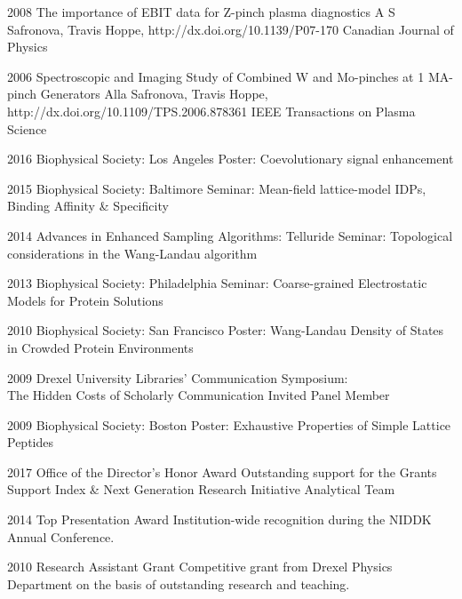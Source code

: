 \documentclass[]{scrartcl}
\begin{document}
\begin{cleanCV}
\Paper
{2008}
{The importance of EBIT data for Z-pinch plasma diagnostics}
{A S Safronova, Travis Hoppe, \etal}
{http://dx.doi.org/10.1139/P07-170}
{Canadian Journal of Physics}

\Paper
{2006}
{Spectroscopic and Imaging Study of Combined W and Mo-pinches 
  at 1 MA-pinch Generators}
{Alla Safronova, Travis Hoppe, \etal}
{http://dx.doi.org/10.1109/TPS.2006.878361}
{IEEE Transactions on Plasma Science}


\WorkExperienceX
{2016}
{Biophysical Society: Los Angeles}
{Poster: Coevolutionary signal enhancement}

\WorkExperienceX
{2015}
{Biophysical Society: Baltimore}
{Seminar: Mean-field lattice-model IDPs, Binding Affinity \& Specificity}

\WorkExperienceX
{2014}
{Advances in Enhanced Sampling Algorithms: Telluride}
{Seminar: Topological considerations in the Wang-Landau algorithm}

\WorkExperienceX
{2013}
{Biophysical Society: Philadelphia}
{Seminar: Coarse-grained Electrostatic Models for Protein Solutions}

\WorkExperienceX
{2010}
{Biophysical Society: San Francisco}
{Poster: Wang-Landau Density of States in Crowded Protein Environments}

\WorkExperienceX
{2009}
{Drexel University Libraries' Communication Symposium:\\The Hidden Costs of Scholarly Communication}
{Invited Panel Member}

\WorkExperienceX
{2009}
{Biophysical Society: Boston}
{Poster: Exhaustive Properties of Simple Lattice Peptides}



\WorkExperienceX
{2017}
{Office of the Director's Honor Award}
{Outstanding support for the Grants Support Index \& Next Generation Research Initiative Analytical Team}

\WorkExperienceX
{2014}
{Top Presentation Award}
{Institution-wide recognition during the NIDDK Annual Conference.}

\WorkExperienceX
{2010}
{Research Assistant Grant}
{Competitive grant from Drexel Physics Department on the basis of outstanding research and teaching.}


\end{cleanCV}
\end{document}
